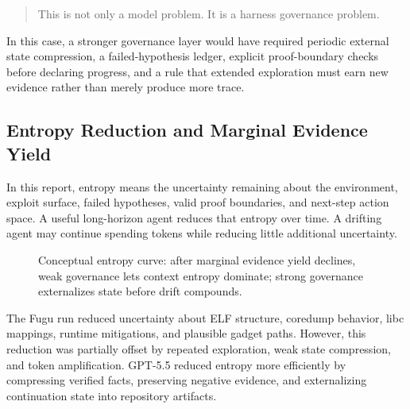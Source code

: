 \documentclass[a4paper,11pt]{article}
\begin{document}
\begin{quote}
This is not only a model problem. It is a harness governance problem.
\end{quote}

In this case, a stronger governance layer would have required periodic external state compression, a failed-hypothesis ledger, explicit proof-boundary checks before declaring progress, and a rule that extended exploration must earn new evidence rather than merely produce more trace.

\subsection{Entropy Reduction and Marginal Evidence Yield}

In this report, entropy means the uncertainty remaining about the environment, exploit surface, failed hypotheses, valid proof boundaries, and next-step action space. A useful long-horizon agent reduces that entropy over time. A drifting agent may continue spending tokens while reducing little additional uncertainty.

\begin{figure}[htbp]
\centering
{}
\caption{Conceptual entropy curve: after marginal evidence yield declines, weak governance lets context entropy dominate; strong governance externalizes state before drift compounds.}
\end{figure}

The Fugu run reduced uncertainty about ELF structure, coredump behavior, libc mappings, runtime mitigations, and plausible gadget paths. However, this reduction was partially offset by repeated exploration, weak state compression, and token amplification. GPT-5.5 reduced entropy more efficiently by compressing verified facts, preserving negative evidence, and externalizing continuation state into repository artifacts.
\end{document}
